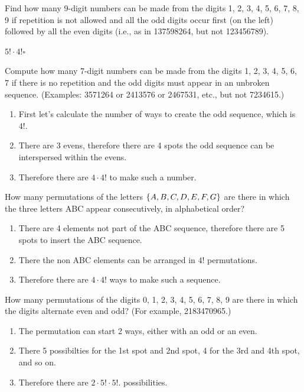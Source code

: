\documentclass[openany, 12pt]{book}
\begin{document}
\begin{exercise}{}{}
	Find how many 9-digit numbers can be made from the digits 1, 2, 3, 4, 5, 6, 7,
	8, 9 if repetition is not allowed and all the odd digits occur first (on the left)
	followed by all the even digits (i.e., as in 137598264, but not 123456789).

	$5! \cdot 4! \square$
\end{exercise}

\begin{exercise}{}{}
	Compute how many 7-digit numbers can be made from the digits 1, 2, 3, 4, 5, 6, 7
	if there is no repetition and the odd digits must appear in an unbroken sequence.
	(Examples: 3571264 or 2413576 or 2467531, etc., but not 7234615.)
	\begin{enumerate}[label={\textbullet}, leftmargin=*, itemsep=0pt, parsep=0pt]
		\item First let's calculate the number of ways to create the odd sequence, which
		      is $4!$.
		\item There are 3 evens, therefore there are 4 spots the odd sequence can be
		      interspersed within the evens.
		\item Therefore there are $4\cdot 4!$ to make such a number.
	\end{enumerate}
\end{exercise}

\begin{exercise}{}{}
	How many permutations of the letters $\{A, B, C, D, E, F, G\}$
	are there in which the three letters ABC appear consecutively, in
	alphabetical order?
	\begin{enumerate}[label={\textbullet}, leftmargin=*, itemsep=0pt, parsep=0pt]
		\item There are 4 elements not part of the ABC sequence, therefore there are 5
		      spots to insert the ABC sequence.
		\item There the non ABC elements can be arranged in $4!$ permutations.
		\item Therefore there are $4\cdot4!$ ways to make such a sequence.
	\end{enumerate}
\end{exercise}

\begin{exercise}{}{}
	How many permutations of the digits 0, 1, 2, 3, 4, 5, 6, 7, 8, 9 are there
	in which the digits alternate even and odd? (For example, 2183470965.)
	\begin{enumerate}[label={\textbullet}, leftmargin=*, itemsep=0pt, parsep=0pt]
		\item The permutation can start 2 ways, either with an odd or an even.
		\item There 5 possibilties for the 1st spot and 2nd spot, 4 for the 3rd and 4th
		      spot, and so on.
		\item Therefore there are $2\cdot 5!\cdot5!$. possibilities.
	\end{enumerate}
\end{exercise}
\end{document}
